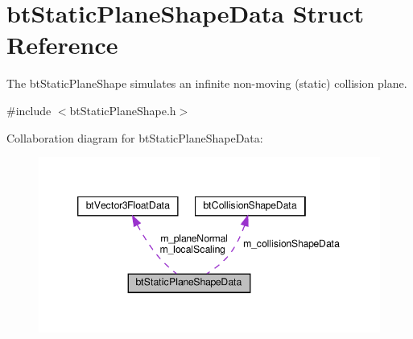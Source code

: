 \hypertarget{structbtStaticPlaneShapeData}{}\section{bt\+Static\+Plane\+Shape\+Data Struct Reference}
\label{structbtStaticPlaneShapeData}


The bt\+Static\+Plane\+Shape simulates an infinite non-\/moving (static) collision plane.  




{\ttfamily \#include $<$bt\+Static\+Plane\+Shape.\+h$>$}



Collaboration diagram for bt\+Static\+Plane\+Shape\+Data\+:
\nopagebreak
\begin{figure}[H]
\begin{center}
\leavevmode
\includegraphics[width=346pt]{structbtStaticPlaneShapeData__coll__graph}
\end{center}
\end{figure}
